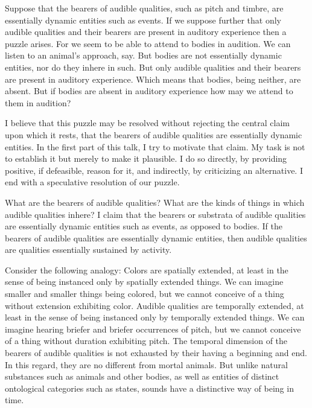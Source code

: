 \documentclass[12pt]{article}
\title{\mytitle}
\author{\myauthor}
\date{} %
\begin{document}
\maketitle

\setlength{\parindent}{1em}


Suppose that the bearers of audible qualities, such as pitch and timbre, are essentially dynamic entities such as events. If we suppose further that only audible qualities and their bearers are present in auditory experience then a puzzle arises. For we seem to be able to attend to bodies in audition. We can listen to an animal’s approach, say. But bodies are not essentially dynamic entities, nor do they inhere in such. But only audible qualities and their bearers are present in auditory experience. Which means that bodies, being neither, are absent. But if bodies are absent in auditory experience how may we attend to them in audition?

I believe that this puzzle may be resolved without rejecting the central claim upon which it rests, that the bearers of audible qualities are essentially dynamic entities. In the first part of this talk, I try to motivate that claim. My task is not to establish it but merely to make it plausible. I do so directly, by providing positive, if defeasible, reason for it, and indirectly, by criticizing an alternative. I end with a speculative resolution of our puzzle.

What are the bearers of audible qualities? What are the kinds of things in which audible qualities inhere? I claim that the bearers or substrata of audible qualities are essentially dynamic entities such as events, as opposed to bodies. If the bearers of audible qualities are essentially dynamic entities, then audible qualities are qualities essentially sustained by activity.

Consider the following analogy: Colors are spatially extended, at least in the sense of being instanced only by spatially extended things. We can imagine smaller and smaller things being colored, but we cannot conceive of a thing without extension exhibiting color. Audible qualities are temporally extended, at least in the sense of being instanced only by temporally extended things. We can imagine hearing briefer and briefer occurrences of pitch, but we cannot conceive of a thing without duration exhibiting pitch. The temporal dimension of the bearers of audible qualities is not exhausted by their having a beginning and end. In this regard, they are no different from mortal animals. But unlike natural substances such as animals and other bodies, as well as entities of distinct ontological categories such as states, sounds have a distinctive way of being in time.
\end{document}
